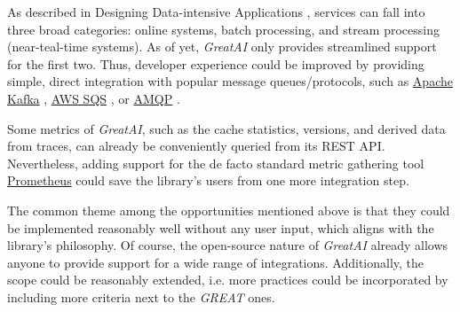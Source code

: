 As described in Designing Data-intensive Applications \cite{kleppmann2017designing}, services can fall into three broad categories: online systems, batch processing, and stream processing (near-teal-time systems). As of yet, \textit{GreatAI} only provides streamlined support for the first two. Thus, developer experience could be improved by providing simple, direct integration with popular message queues/protocols, such as \href{https://kafka.apache.org/}{Apache Kafka} \cite{kreps2011kafka}, \href{https://aws.amazon.com/sqs/}{AWS SQS} \cite{garfinkel2007evaluation}, or \href{https://www.amqp.org/}{AMQP} \cite{vinoski2006advanced}.

Some metrics of \textit{GreatAI}, such as the cache statistics, versions, and derived data from traces, can already be conveniently queried from its REST API. Nevertheless, adding support for the de facto standard metric gathering tool \href{https://prometheus.io/}{Prometheus} could save the library's users from one more integration step.

The common theme among the opportunities mentioned above is that they could be implemented reasonably well without any user input, which aligns with the library's philosophy. Of course, the open-source nature of \textit{GreatAI} already allows anyone to provide support for a wide range of integrations. Additionally, the scope could be reasonably extended, i.e. more practices could be incorporated by including more criteria next to the \textit{GREAT} ones.
